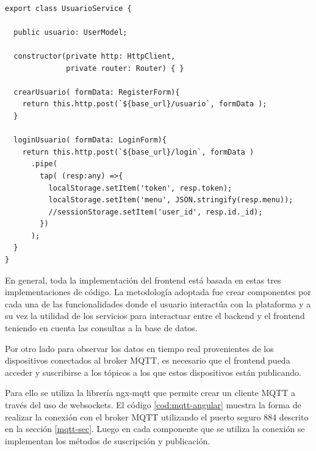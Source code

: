 \begin{lstlisting}[label=cod:service-login,caption=Fragmentos de código mas relevantes utilizados en el servicio de usuario.] 

export class UsuarioService {

  public usuario: UserModel;

  constructor(private http: HttpClient,
              private router: Router) { }

  crearUsuario( formData: RegisterForm){
    return this.http.post(`${base_url}/usuario`, formData );
  }
  
  loginUsuario( formData: LoginForm){
    return this.http.post(`${base_url}/login`, formData )
      .pipe(
        tap( (resp:any) =>{
          localStorage.setItem('token', resp.token);
          localStorage.setItem('menu', JSON.stringify(resp.menu));
          //sessionStorage.setItem('user_id', resp.id._id);
        })
      );
  }
}

\end{lstlisting} 

En general, toda la implementación del frontend está basada en estas tres implementaciones de código.  La metodología adoptada fue crear componentes por cada una de las funcionalidades donde el usuario interactúa con la plataforma y a su vez la utilidad de los servicios para interactuar entre el backend y el frontend teniendo en cuenta las consultas a la base de datos. 

Por otro lado para observar los datos en tiempo real provenientes de los dispositivos conectados al broker MQTT, es necesario que el frontend pueda acceder y suscribirse a los tópicos a los que estos dispositivos están publicando. 

Para ello se utiliza la librería ngx-mqtt\citep{WEBSITE:41} que permite crear un cliente MQTT a través del uso de websockets\citep{WEBSITE:42}. El código \ref{cod:mqtt-angular} muestra la forma de realizar la conexión con el broker MQTT utilizando el puerto seguro 884 descrito en la sección \ref{mqtt-sec}. Luego en cada componente que se utiliza la conexión se implementan los métodos de suscripción y publicación. 

